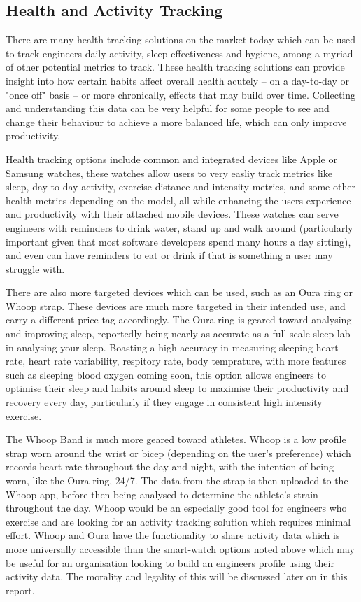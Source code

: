 \documentclass{article}
\begin{document}
        \subsection{Health and Activity Tracking}
        There are many health tracking solutions on the market today which can be used to track engineers daily activity, sleep effectiveness and hygiene, among a myriad of other potential metrics to track. These health tracking solutions can provide insight into how certain habits affect overall health acutely -- on a day-to-day or "once off" basis -- or more chronically, effects that may build over time. Collecting and understanding this data can be very helpful for some people to see and change their behaviour to achieve a more balanced life, which can only improve productivity.\

        Health tracking options include common and integrated devices like Apple or Samsung watches, these watches allow users to very easliy track metrics like sleep, day to day activity, exercise distance and intensity metrics, and some other health metrics depending on the model, all while enhancing the users experience and productivity with their attached mobile devices. These watches can serve engineers with reminders to drink water, stand up and walk around (particularly important given that most software developers spend many hours a day sitting), and even can have reminders to eat or drink if that is something a user may struggle with. \

        There are also more targeted devices which can be used, such as an Oura ring or Whoop strap. These devices are much more targeted in their intended use, and carry a different price tag accordingly. The Oura ring is geared toward analysing and improving sleep, reportedly being nearly as accurate as a full scale sleep lab in analysing your sleep. Boasting a high accuracy in measuring sleeping heart rate, heart rate variability, respitory rate, body temprature, with more features such as sleeping blood oxygen coming soon, this option allows engineers to optimise their sleep and habits around sleep to maximise their productivity and recovery every day, particularly if they engage in consistent high intensity exercise.\

        The Whoop Band is much more geared toward athletes. Whoop is a low profile strap worn around the wrist or bicep (depending on the user's preference) which records heart rate throughout the day and night, with the intention of being worn, like the Oura ring, 24/7. The data from the strap is then uploaded to the Whoop app, before then being analysed to determine the athlete's strain throughout the day. Whoop would be an especially good tool for engineers who exercise and are looking for an activity tracking solution which requires minimal effort.
        Whoop and Oura have the functionality to share activity data which is more universally accessible than the smart-watch options noted above which may be useful for an organisation looking to build an engineers profile using their activity data. The morality and legality of this will be discussed later on in this report. 
\end{document}
